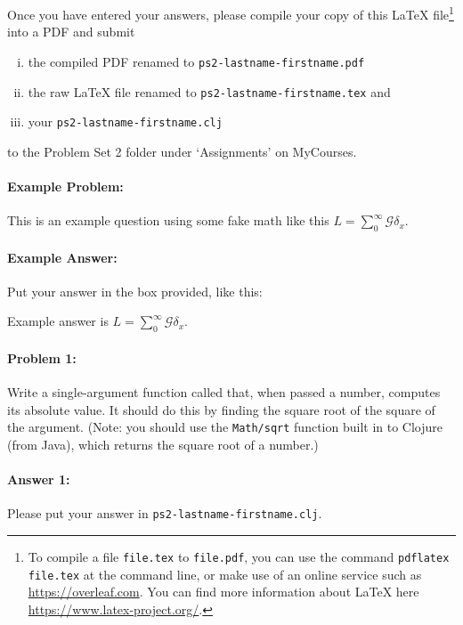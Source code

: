 \documentclass[10pt]{article}
\newenvironment{AnswerBox}{\begin{mdframed}[style=simple]}{\end{mdframed}}
\newcommand{\required}[1]{{\color{blue}{#1}}}
\newcommand{\PSnum}{2}
\begin{document}
Once you have entered your answers, please compile your copy of this \LaTeX{}
file\footnote{To compile a file \texttt{file.tex} to \texttt{file.pdf}, you can
  use the command \texttt{pdflatex file.tex} at the command line, or make use of
  an online service such as \url{https://overleaf.com}. You can find more
information about \LaTeX{} here \url{https://www.latex-project.org/}.} into a
PDF and submit
\begin{enumerate}[(i),noitemsep]
  \item the compiled PDF renamed to \texttt{ps\PSnum-lastname-firstname.pdf}
  \item the raw \LaTeX{} file renamed to
    \texttt{ps\PSnum-lastname-firstname.tex} and
  \item your \texttt{ps\PSnum-lastname-firstname.clj}
\end{enumerate}
to the Problem Set \PSnum{} folder under `Assignments' on MyCourses.

\noindent\hrulefill %

\paragraph{Example Problem:} This is an example question using some fake math
like this $L=\sum_0^{\infty} \mathcal{G} \delta_x$.

\paragraph{Example Answer:} Put your answer in the box provided, like this:
\begin{AnswerBox}
  Example answer is $L=\sum_0^{\infty} \mathcal{G} \delta_x$.
\end{AnswerBox}


\pagebreak%

\paragraph{Problem 1:}
Write a single-argument function called \required{\texttt{absval}} that, when
passed a number,  computes its absolute value.  It should do this by finding the
square root of the square of the argument.  (Note: you should use the
\texttt{Math/sqrt} function built in to Clojure (from Java), which returns the
square root of a number.)

\paragraph{Answer 1:} Please put your answer in
\texttt{ps\PSnum-lastname-firstname.clj}.
\end{document}
